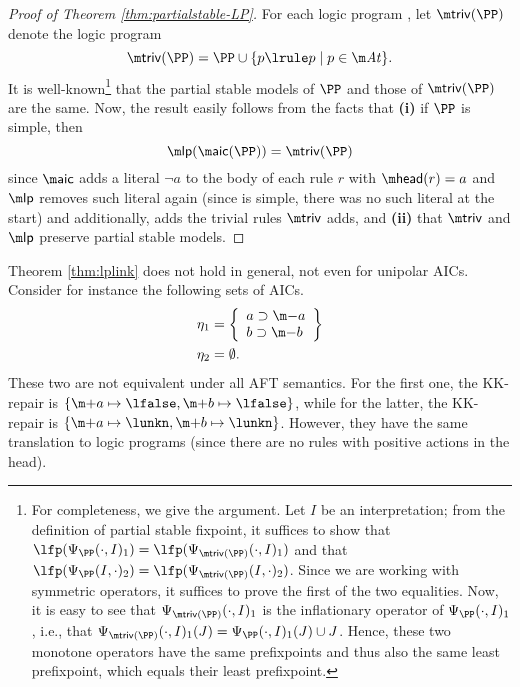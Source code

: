 \begin{proof}[Proof of Theorem \ref{thm:partialstable-LP}]
 For each logic program \PP, let $\triv(\PP)$ denote the logic program 
 \[
  \triv(\PP) = \PP \cup \{p\lrule p\mid p\in \atoms\}.
 \]
 It is well-known\footnote{For completeness, we give the argument. Let $I$ be an interpretation; from the definition of partial stable fixpoint, it suffices to show that 
 $\lfp(\Psi_\PP(\cdot,I)_1)= \lfp(\Psi_{\triv(\PP)}(\cdot,I)_1)$ and that 
  $\lfp(\Psi_\PP(I,\cdot)_2)= \lfp(\Psi_{\triv(\PP)}(I,\cdot)_2)$. Since we are working with symmetric operators, it suffices to prove the first of the two equalities. 
  Now, it is easy to see that $\Psi_{\triv(\PP)}(\cdot,I)_1$ is the inflationary operator of $\Psi_\PP(\cdot,I)_1$, i.e., that $\Psi_{\triv(\PP)}(\cdot,I)_1(J) = \Psi_\PP(\cdot,I)_1(J)\cup J$. Hence, these two monotone operators have the same prefixpoints and thus also the same least prefixpoint, which equals their least prefixpoint. 
  }
 that the partial stable models of $\PP$ and those of $\triv(\PP)$ are the same. 
 Now, the result easily follows from the facts that \textbf{(i)} if $\PP$ is simple, then
\[
\lpop(\aicop(\PP)) = \triv(\PP)\]
since $\aicop$ adds a literal $\lnot a$ to the body of each rule $r$ with $\head(r) = a$ and $\lpop$ removes such literal again (since \PP is simple, there was no such literal at the start) and additionally, adds the trivial rules $\triv$ adds, and \textbf{(ii)} 
 that $\triv$ and $\lpop$ preserve partial stable models. 
% 
\end{proof}


\begin{example}\label{ex:unipolarno}
 Theorem \ref{thm:lplink} does not hold in general, not even for unipolar AICs. 
 Consider for instance the following sets of AICs. 
 \begin{align*}\eta_1 &= \left\{\begin{array}{l}
                    a \aicrule \remove a\\
                     b  \aicrule \remove b
                   \end{array}\right\}\\
                   \eta_2 &=\emptyset.
\end{align*}
These two are not equivalent under all AFT semantics. 
For the first one, the KK-repair is $\{\add a\mapsto\lfalse,\add b\mapsto\lfalse\}$, while for the latter, the KK-repair is $\{\add a\mapsto\lunkn,\add b\mapsto\lunkn\}$. However, they have the same translation to logic programs (since there are no rules with positive actions in the head).          
%                    
% 
\end{example}

